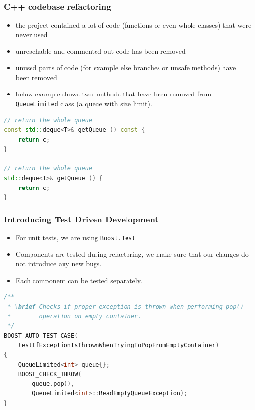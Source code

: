 \documentclass[10pt]{beamer}
\begin{document}
\begin{frame}[fragile]
\frametitle{C++ codebase refactoring}
\begin{itemize}
    \item the project contained a lot of code (functions or even whole classes) that were never used
    \item unreachable and commented out code has been removed
    \item unused parts of code (for example else branches or unsafe methods) have been removed
    \item below example shows two methods that have been removed from \lstinline[basicstyle=\ttfamily\normalsize]{QueueLimited} class (a queue with size limit).
\end{itemize}
\begin{lstlisting}[language=c++, caption={Example of removed code.}]
// return the whole queue
const std::deque<T>& getQueue () const {
    return c;
}

// return the whole queue
std::deque<T>& getQueue () {
    return c;
}
\end{lstlisting}
\end{frame}


\begin{frame}[fragile]
\frametitle{Introducing Test Driven Development}
\begin{itemize}
\item For unit tests, we are using \lstinline[basicstyle=\ttfamily\normalsize]{Boost.Test}
\item Components are tested during refactoring, we make sure that our changes do not introduce any new bugs.
\item Each component can be tested separately.
\end{itemize}
\begin{lstlisting}[language=c++, caption={Unit test example}]
/**
 * \brief Checks if proper exception is thrown when performing pop() 
 *        operation on empty container.
 */
BOOST_AUTO_TEST_CASE(
    testIfExceptionIsThrownWhenTryingToPopFromEmptyContainer)
{
    QueueLimited<int> queue{};
    BOOST_CHECK_THROW(
        queue.pop(), 
        QueueLimited<int>::ReadEmptyQueueException);
}   
\end{lstlisting}
\end{frame}
\end{document}
